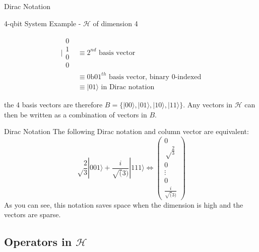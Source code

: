 \documentclass[svgnames,smaller,aspectratio=169]{beamer}
\begin{document}
\begin{frame}[fragile]{Dirac Notation}
  
  \begin{block}{4-qbit System Example - $\mathcal{H}$ of dimension 4}
    \begin{center}
      \begin{align*}
        \biggl|\begin{smallmatrix} 0 \\ 1 \\ 0 \\ 0 \end{smallmatrix} & \equiv 2^{nd} \text{ basis vector} \\%
        & \equiv 0\text{b}01^{th} \text{ basis vector, binary 0-indexed} \\[0.8em]
        & \equiv |01\rangle \text{ in Dirac notation}
      \end{align*}
    \end{center}
    the 4 basis vectors are therefore $\textit{B} = \{|00\rangle, |01\rangle, |10\rangle, |11\rangle\}$. Any vectors in
    $\mathcal{H}$ can then be written as a combination of vectors in $\textit{B}$.
  \end{block}
\end{frame}

\begin{frame}[fragile]{Dirac Notation}
  The following Dirac notation and column vector are equivalent:
  \begin{equation}
    \sqrt\frac{2}{3}|001\rangle + \frac{i}{\sqrt(3)}|111\rangle \Longleftrightarrow \begin{pmatrix}0 \\ \sqrt\frac{2}{3}
      \\ 0 \\ \vdots \\ 0 \\ \frac{i}{\sqrt(3)} \end{pmatrix}
  \end{equation}
  As you can see, this notation saves space when the dimension is high and the vectors are sparse.
\end{frame}

\subsection{Operators in $\mathcal{H}$}
\end{document}
